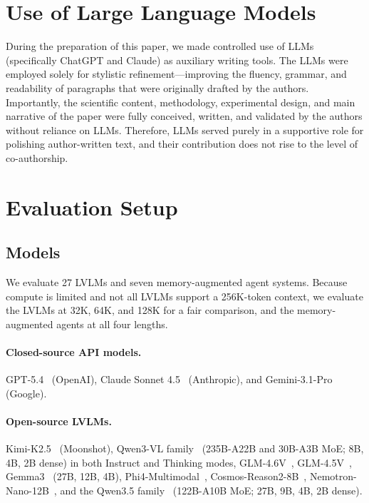 \documentclass{llmxive}
\begin{document}

\appendix


\section{Use of Large Language Models}
\label{app:llm_use}

During the preparation of this paper, we made controlled use of LLMs (specifically ChatGPT and Claude) as auxiliary writing tools. The LLMs were employed solely for stylistic refinement---improving the fluency, grammar, and readability of paragraphs that were originally drafted by the authors. Importantly, the scientific content, methodology, experimental design, and main narrative of the paper were fully conceived, written, and validated by the authors without reliance on LLMs. Therefore, LLMs served purely in a supportive role for polishing author-written text, and their contribution does not rise to the level of co-authorship.
\vspace{-3mm}

\section{Evaluation Setup}
\label{app:eval_setup}

\subsection{Models}
\label{subsec:models}

We evaluate 27 LVLMs and seven memory-augmented agent systems. Because compute is limited and not all LVLMs support a 256K-token context, we evaluate the LVLMs at 32K, 64K, and 128K for a fair comparison, and the memory-augmented agents at all four lengths.

\paragraph{Closed-source API models.}
GPT-5.4~\citep{singh2025openaigpt5card} (OpenAI), Claude Sonnet 4.5~\citep{anthropic2025claudesonnet45card} (Anthropic), and Gemini-3.1-Pro~\citep{googledeepmind2026gemini31pro} (Google).

\paragraph{Open-source LVLMs.}
Kimi-K2.5~\citep{kimiteam2026kimik25visualagentic} (Moonshot), 
Qwen3-VL family~\citep{bai2025qwen3vltechnicalreport} (235B-A22B and 30B-A3B MoE; 8B, 4B, 2B dense) in both Instruct and Thinking modes, GLM-4.6V~\citep{zai2025glm46vcard}, GLM-4.5V~\citep{vteam2026glm45vglm41vthinkingversatilemultimodal}, Gemma3~\citep{gemmateam2025gemma3technicalreport} (27B, 12B, 4B), Phi4-Multimodal~\citep{microsoft2025phi4minitechnicalreportcompact}, Cosmos-Reason2-8B~\citep{nvidia2025cosmosreason2card}, Nemotron-Nano-12B~\citep{nvidia2025nvidianemotronnanov2}, and the Qwen3.5 family~\citep{qwenteam2026qwen35nativemultimodalagents} (122B-A10B MoE; 27B, 9B, 4B, 2B dense).
\end{document}
